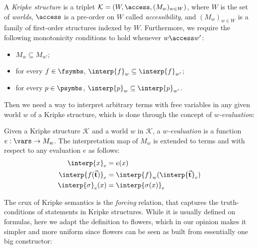 \begin{scope}
\begin{definition}
  A \emph{Kripke structure} is a triplet $\mathcal{K} = ( W, \access,
  (M_w)_{w \in W} )$, where $W$ is the set of \emph{worlds}, $\access$ is
  a pre-order on $W$ called \emph{accessibility}, and $(M_w)_{w \in W}$ is a
  family of first-order structures indexed by $W$. Furthermore, we require the
  following monotonicity conditions to hold whenever $w \access w'$:
  \begin{itemize}
    \item $M_w \subseteq M_{w'}$;
    \item for every $f \in \fsymbs$, $\interp{f}_w \subseteq
      \interp{f}_{w'}$;
    \item for every $p \in \psymbs$, $\interp{p}_w \subseteq
      \interp{p}_{w'}$.
  \end{itemize}
\end{definition}

Then we need a way to interpret arbitrary terms with free variables in any given
world $w$ of a Kripke structure, which is done through the concept of
\emph{$w$-evaluation}:

\begin{definition}[$w$-evaluation]
  Given a Kripke structure $\mathcal{K}$ and a world $w$ in $\mathcal{K}$, a
  \emph{$w$-evaluation} is a function $e : \vars \to M_w$.
  The interpretation map of $M_w$ is extended to terms and  with
  respect to any evaluation $e$ as follows:
  \begin{align*}
  \interp{x}_e &= e(x) \\
  \interp{f(\tvec{t})}_e &= \interp{f}_w(\interp{\tvec{t}}_e) \\
  \interp{\sigma}_e(x) &= \interp{\sigma(x)}_e
  \end{align*}
\end{definition}

The crux of Kripke semantics is the \emph{forcing} relation, that captures the
truth-conditions of statements in Kripke structures. While it is usually defined
on formulas, here we adapt the definition to flowers, which in our opinion makes
it simpler and more uniform since flowers can be seen as built from essentially
one big constructor:


\end{scope}
